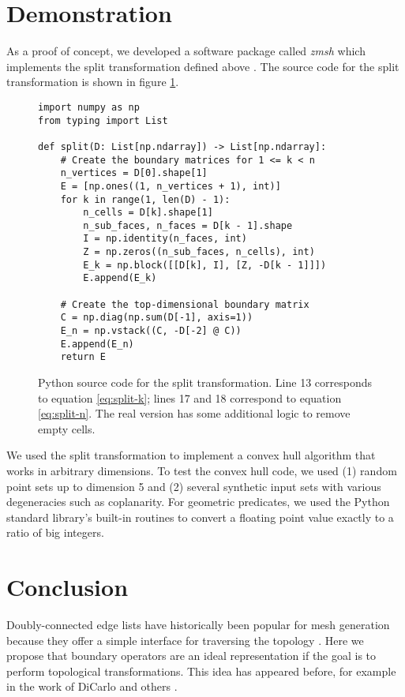 \documentclass[twocolumn]{article}
\begin{document}
\section{Demonstration}

As a proof of concept, we developed a software package called \emph{zmsh} which implements the split transformation defined above \cite{shapero2023zmsh}.
The source code for the split transformation is shown in figure \ref{fig:split-source-code}.
\begin{figure}
    \begin{verbatim}
import numpy as np
from typing import List

def split(D: List[np.ndarray]) -> List[np.ndarray]:
    # Create the boundary matrices for 1 <= k < n
    n_vertices = D[0].shape[1]
    E = [np.ones((1, n_vertices + 1), int)]
    for k in range(1, len(D) - 1):
        n_cells = D[k].shape[1]
        n_sub_faces, n_faces = D[k - 1].shape
        I = np.identity(n_faces, int)
        Z = np.zeros((n_sub_faces, n_cells), int)
        E_k = np.block([[D[k], I], [Z, -D[k - 1]]])
        E.append(E_k)

    # Create the top-dimensional boundary matrix
    C = np.diag(np.sum(D[-1], axis=1))
    E_n = np.vstack((C, -D[-2] @ C))
    E.append(E_n)
    return E
    \end{verbatim}
    \caption{Python source code for the split transformation.
    Line 13 corresponds to equation \eqref{eq:split-k}; lines 17 and 18 correspond to equation \eqref{eq:split-n}.
    The real version has some additional logic to remove empty cells.}
    \label{fig:split-source-code}
\end{figure}
We used the split transformation to implement a convex hull algorithm that works in arbitrary dimensions.
To test the convex hull code, we used (1) random point sets up to dimension 5 and (2) several synthetic input sets with various degeneracies such as coplanarity.
For geometric predicates, we used the Python standard library's built-in routines to convert a floating point value exactly to a ratio of big integers.


\section{Conclusion}

Doubly-connected edge lists have historically been popular for mesh generation because they offer a simple interface for traversing the topology \cite{guibas1985primitives}.
Here we propose that boundary operators are an ideal representation if the goal is to perform topological transformations.
This idea has appeared before, for example in the work of DiCarlo and others \cite{dicarlo2007solid}.
\end{document}
